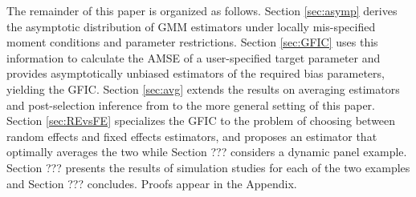 The remainder of this paper is organized as follows. Section \ref{sec:asymp} derives the asymptotic distribution of GMM estimators under locally mis-specified moment conditions and parameter restrictions. 
Section \ref{sec:GFIC} uses this information to calculate the AMSE of a user-specified target parameter and provides asymptotically unbiased estimators of the required bias parameters, yielding the GFIC. 
Section \ref{sec:avg} extends the results on averaging estimators and post-selection inference from \cite{DiTraglia2012} to the more general setting of this paper.
Section \ref{sec:REvsFE} specializes the GFIC to the problem of choosing between random effects and fixed effects estimators, and proposes an estimator that optimally averages the two while Section ??? considers a dynamic panel example.
Section ??? presents the results of simulation studies for each of the two examples and Section ??? concludes. 
Proofs appear in the Appendix.

